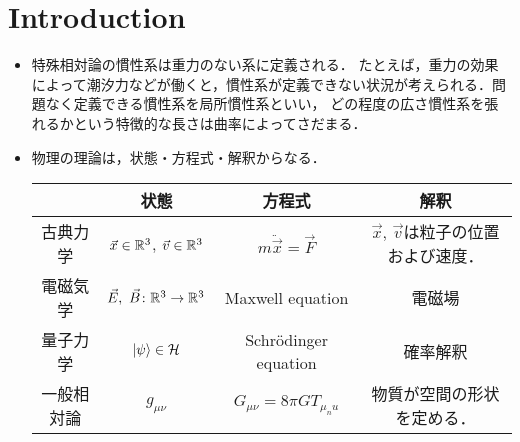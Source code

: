 \section{Introduction}
\begin{itemize}
	\item 特殊相対論の慣性系は重力のない系に定義される．
	たとえば，重力の効果によって潮汐力などが働くと，慣性系が定義できない状況が考えられる．問題なく定義できる慣性系を局所慣性系といい，
	どの程度の広さ慣性系を張れるかという特徴的な長さは曲率によってさだまる．
	\item 物理の理論は，状態・方程式・解釈からなる．
	\begin{table}[htbp]
		\centering
		\begin{tabular}{c|ccc}
		 & 状態 & 方程式 & 解釈 \\\hline
		 古典力学 & $\vec{x}\in\mathbb{R}^3$, $\vec{v}\in\mathbb{R}^3$ & $m\ddot{\vec{x}} = \vec{F}$ & $\vec{x}$, $\vec{v}$は粒子の位置および速度．\\
		 電磁気学 & $\vec{E},\ \vec{B}\colon\R^3 \to \R^3$ & Maxwell equation & 電磁場\\
		 量子力学 & $\ket{\psi}\in\mathcal{H}$ & Schr\"{o}dinger equation & 確率解釈\\
		 一般相対論 & $g_{\mu\nu}$ & $G_{\mu\nu} = 8\pi G T_{\mu_nu}$ & 物質が空間の形状を定める．
		\end{tabular}
	\end{table} 
\end{itemize}
